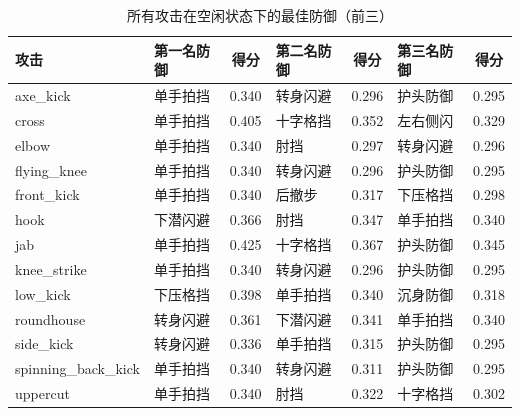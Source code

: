 \begin{table}[H]
\centering
\caption{所有攻击在空闲状态下的最佳防御（前三）}
\begin{tabular}{l l c l c l c}
\toprule
攻击 & 第一名防御 & 得分 & 第二名防御 & 得分 & 第三名防御 & 得分 \\
\midrule
axe\_kick & 单手拍挡 & 0.340 & 转身闪避 & 0.296 & 护头防御 & 0.295 \\
cross & 单手拍挡 & 0.405 & 十字格挡 & 0.352 & 左右侧闪 & 0.329 \\
elbow & 单手拍挡 & 0.340 & 肘挡 & 0.297 & 转身闪避 & 0.296 \\
flying\_knee & 单手拍挡 & 0.340 & 转身闪避 & 0.296 & 护头防御 & 0.295 \\
front\_kick & 单手拍挡 & 0.340 & 后撤步 & 0.317 & 下压格挡 & 0.298 \\
hook & 下潜闪避 & 0.366 & 肘挡 & 0.347 & 单手拍挡 & 0.340 \\
jab & 单手拍挡 & 0.425 & 十字格挡 & 0.367 & 护头防御 & 0.345 \\
knee\_strike & 单手拍挡 & 0.340 & 转身闪避 & 0.296 & 护头防御 & 0.295 \\
low\_kick & 下压格挡 & 0.398 & 单手拍挡 & 0.340 & 沉身防御 & 0.318 \\
roundhouse & 转身闪避 & 0.361 & 下潜闪避 & 0.341 & 单手拍挡 & 0.340 \\
side\_kick & 转身闪避 & 0.336 & 单手拍挡 & 0.315 & 护头防御 & 0.295 \\
spinning\_back\_kick & 单手拍挡 & 0.340 & 转身闪避 & 0.311 & 护头防御 & 0.295 \\
uppercut & 单手拍挡 & 0.340 & 肘挡 & 0.322 & 十字格挡 & 0.302 \\
\bottomrule
\end{tabular}
\end{table}
